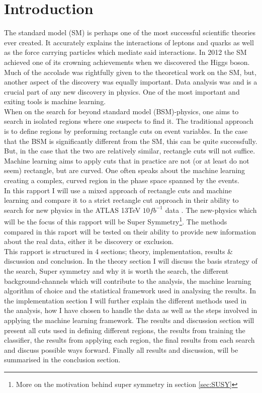 \documentclass{article}
\begin{document}
\section{Introduction}
The standard model (SM) is perhaps one of the most successful scientific theories ever created. It accurately explains the interactions of leptons and quarks as well as the force carrying particles which mediate said interactions. In 2012 the SM achieved one of its crowning achievements when we discovered the Higgs boson. Much of the accolade was rightfully given to the theoretical work on the SM, but, another aspect of the discovery was equally important. Data analysis was and is a crucial part of any new discovery in physics. One of the most important and exiting tools is machine learning.
\\
When on the search for beyond standard model (BSM)-physics, one aims to search in isolated regions where one suspects to find it. The traditional approach is to define regions by preforming rectangle cuts on event variables. In the case that the BSM is significantly different from the SM, this can be quite successfully. But, in the case that the two are relatively similar, rectangle cuts will not suffice. Machine learning aims to apply cuts that in practice are not (or at least do not seem) rectangle, but are curved. One often speaks about the machine learning creating a complex, curved region in the phase space spanned by the events.
\\
In this rapport I will use a mixed approach of rectangle cuts and machine learning and compare it to a strict rectangle cut approach in their ability to search for new physics in the ATLAS 13TeV $10fb^{-1}$ data \cite{ATL-OREACH-PUB-2020-001}. The new-physics which will be the focus of this rapport will be Super Symmetry\footnote{More on the motivation behind super symmetry in section \ref{sec:SUSY}}. The methods compared in this raport will be tested on their ability to provide new information about the real data, either it be discovery or exclusion.
\\
This rapport is structured in 4 sections; theory, implementation, results & discussion and conclusion. In the theory section I will discuss the basis strategy of the search, Super symmetry and why it is worth the search, the different background-channels which will contribute to the analysis, the machine learning algorithm of choice and the statistical framework used in analysing the results. In the implementation section I will further explain the different methods used in the analysis, how I have chosen to handle the data as well as the steps involved in applying the machine learning framework. The results and discussion section will present all cuts used in defining different regions, the results from training the classifier, the results from applying each region, the final results from each search and discuss possible ways forward. Finally all results and discussion, will be summarised in the conclusion section.
\end{document}
